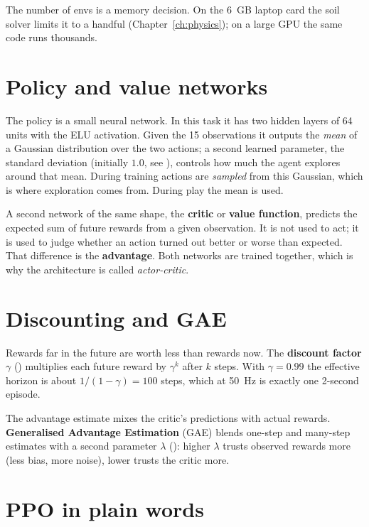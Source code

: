 The number of envs is a memory decision. On the 6~GB laptop card the soil
solver limits it to a handful (Chapter~\ref{ch:physics}); on a large GPU the
same code runs thousands.

\section{Policy and value networks}
\label{sec:networks}

The policy is a small neural network. In this task it has two hidden layers of
64 units with the ELU activation. Given the 15 observations it outputs the
\emph{mean} of a Gaussian distribution over the two actions; a second learned
parameter, the standard deviation (initially $1.0$, see
), controls how much the agent explores around that mean.
During training actions are \emph{sampled} from this Gaussian, which is where
exploration comes from. During play the mean is used.

A second network of the same shape, the \textbf{critic} or \textbf{value
function}, predicts the expected sum of future rewards from a given
observation. It is not used to act; it is used to judge whether an action
turned out better or worse than expected. That difference is the
\textbf{advantage}. Both networks are trained together, which is why the
architecture is called \emph{actor-critic}.

\section{Discounting and GAE}

Rewards far in the future are worth less than rewards now. The \textbf{discount
factor} $\gamma$ () multiplies each future reward by
$\gamma^k$ after $k$ steps. With $\gamma=0.99$ the effective horizon is about
$1/(1-\gamma) = 100$ steps, which at 50~Hz is exactly one 2-second episode.

The advantage estimate mixes the critic's predictions with actual rewards.
\textbf{Generalised Advantage Estimation} (GAE) blends one-step and many-step
estimates with a second parameter $\lambda$ (): higher
$\lambda$ trusts observed rewards more (less bias, more noise), lower trusts
the critic more.

\section{PPO in plain words}

